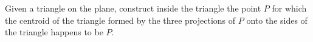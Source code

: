 Given a triangle on the plane, construct inside the triangle the point $P$ for which the centroid of the triangle formed by the three projections of $P$ onto the sides of the triangle happens to be $P$.